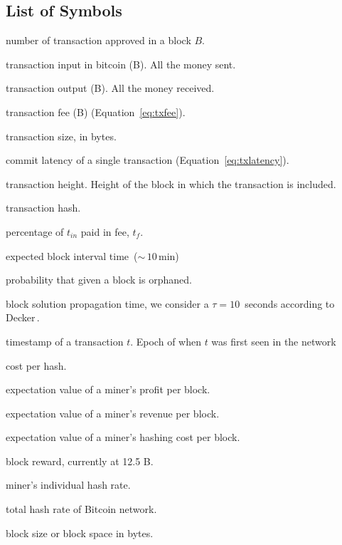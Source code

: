 \documentclass[USenglish]{uit-thesis}
\def\bitcoin{\leavevmode\rlap{\hskip.5pt-}B}
\begin{document}
\begin{appendices}
\chapter{List of Symbols}
\label{app:LOS}
\begin{description}[leftmargin=!, labelwidth=\widthof{\bfseries $M_{demand}(b)$ }]
	\setlength\itemsep{1em}
	\item [$t_B$] number of transaction approved in a block $B$.
	\item [$t_{in}$] transaction input in bitcoin (\bitcoin). All the money sent.
	\item [$t_{ou}$] transaction output (\bitcoin). All the money received.
	\item [$t_{f}$] transaction fee (\bitcoin) (Equation~\ref{eq:txfee}).
	\item [$t_q$] transaction size, in bytes.
	\item [$t_l$] commit latency of a single transaction (Equation~\ref{eq:txlatency}).
	\item [$t_h$] transaction height. Height of the block in which the transaction is included.
	\item [$t_{ha}$] transaction hash.
	\item [$t_\%$] percentage of $t_{in}$ paid in fee, $t_f$.
	\item [$\mathcal{T}$] expected block interval time~($\sim$\,$10$\,min)
	\item [$\mathbb{P}_{orphan}$] probability that given a block is orphaned.
	\item [$\tau$] block solution propagation time, we consider a $\tau = 10$\,
	seconds according to Decker\,\cite{Decker2013IPBN}. %
	\item [$t_{epoch}$] timestamp of a transaction $t$.
	Epoch of when $t$ was first seen in the network
	\item [$\eta$] cost per hash.
	\item [$\langle \Pi \rangle$] expectation value of a miner’s profit per block.
	\item [$\langle V\rangle$] expectation value of a miner’s revenue per block.
	\item [$\langle C\rangle$] expectation value of a miner's hashing cost per block.
	\item [$R$] block reward, currently at 12.5 \bitcoin.
	\item [$h$] miner's individual hash rate.
	\item [$H$] total hash rate of Bitcoin network.
	\item [$Q$] block size or block space in bytes.

\end{description}
\end{appendices}
\end{document}
